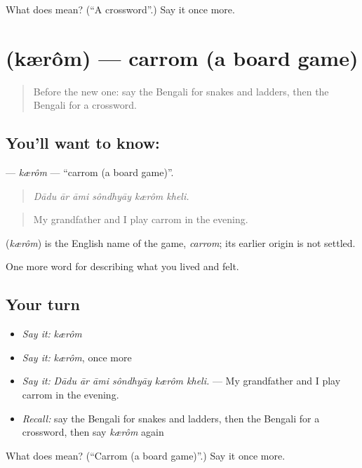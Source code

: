 \begin{tcolorbox}[breakable,colback=teal!4,colframe=teal!35!black,title={Before you move on}]
What does  mean? (\textquotedblleft{}A crossword\textquotedblright{}.) Say it once more.
\end{tcolorbox}
\section[\texorpdfstring{\bn{ক্যারম} (kærôm)}{ক্যারম (kærôm)}]{ (kærôm) — carrom (a board game)}

\label{lesson:BN-C518-kerom}



\begin{quote}
Before the new one: say the Bengali for snakes and ladders, then the Bengali for a crossword.
\end{quote}

\subsection*{You'll want to know: }
\textbf{} — \emph{kærôm} — \textquotedblleft{}carrom (a board game)\textquotedblright{}.

\begin{quote}
     
\end{quote}

\begin{quote}
\emph{Dādu ār āmi sôndhyāy kærôm kheli.}
\end{quote}

\begin{quote}
My grandfather and I play carrom in the evening.
\end{quote}

\begin{cousinweb}
\textbf{} (\emph{kærôm}) is the English name of the game, \emph{carrom}; its earlier origin is not settled.
\end{cousinweb}

\begin{grammarlens}[title={What you've built}]
One more word for describing what you lived and felt.
\end{grammarlens}

\subsection*{Your turn}
\begin{itemize}
\raggedright
  \item \emph{Say it:} \emph{kærôm}
  \item \emph{Say it:} \emph{kærôm}, once more
  \item \emph{Say it:} \emph{Dādu ār āmi sôndhyāy kærôm kheli.} — My grandfather and I play carrom in the evening.
  \item \emph{Recall:} say the Bengali for snakes and ladders, then the Bengali for a crossword, then say \emph{kærôm} again
\end{itemize}

\begin{tcolorbox}[breakable,colback=teal!4,colframe=teal!35!black,title={Before you move on}]
What does  mean? (\textquotedblleft{}Carrom (a board game)\textquotedblright{}.) Say it once more.
\end{tcolorbox}
